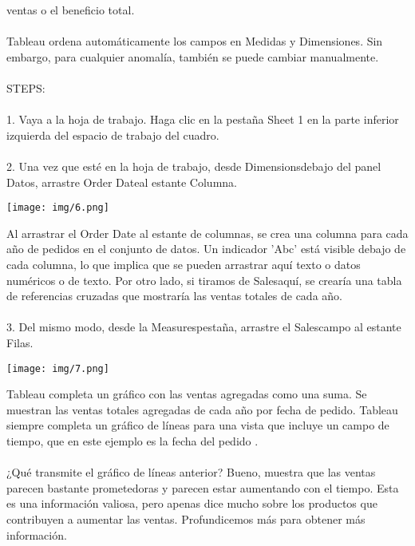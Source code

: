 \documentclass[12pt,letterpaper]{article}
\begin{document}
ventas o el beneficio total.
\\\\Tableau ordena automáticamente los campos en Medidas y Dimensiones. Sin embargo, para cualquier
anomalía, también se puede cambiar manualmente.
\\\\STEPS:
\\\\1. Vaya a la hoja de trabajo. Haga clic en la pestaña Sheet 1 en la parte inferior izquierda del
espacio de trabajo del cuadro.
\\\\2. Una vez que esté en la hoja de trabajo, desde Dimensionsdebajo del panel Datos,
arrastre Order Dateal estante Columna.
\begin{center}
    \texttt{[image: img/6.png]}  
\end{center}
Al arrastrar el Order Date al estante de columnas, se crea una columna para cada año de
pedidos en el conjunto de datos. Un indicador 'Abc' está visible debajo de cada columna, lo que
implica que se pueden arrastrar aquí texto o datos numéricos o de texto. Por otro lado, si
tiramos de Salesaquí, se crearía una tabla de referencias cruzadas que mostraría las ventas
totales de cada año.
\\\\3. Del mismo modo, desde la Measurespestaña, arrastre el Salescampo al estante Filas.
\begin{center}
    \texttt{[image: img/7.png]}  
\end{center}
Tableau completa un gráfico con las ventas agregadas como una suma. Se muestran las ventas totales
agregadas de cada año por fecha de pedido. Tableau siempre completa un gráfico de líneas para una
vista que incluye un campo de tiempo, que en este ejemplo es la fecha del pedido .
\\\\¿Qué transmite el gráfico de líneas anterior? Bueno, muestra que las ventas parecen
bastante prometedoras y parecen estar aumentando con el tiempo. Esta es una
información valiosa, pero apenas dice mucho sobre los productos que contribuyen a
aumentar las ventas. Profundicemos más para obtener más información.
\end{document}

